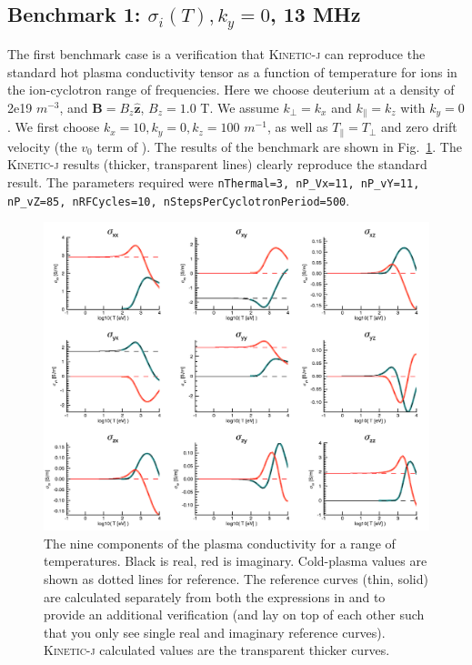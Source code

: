 \documentclass[final,5p,times,twocolumn]{elsarticle}
\let\oldhat\hat
\renewcommand{\vec}[1]{\mathbf{#1}}
\renewcommand{\hat}[1]{\oldhat{\mathbf{#1}}}
\newcommand{\kj}{\textsc{Kinetic-j}\xspace}
\begin{document}
\subsection{Benchmark 1: $\sigma_i\left(T\right), k_{y}=0$, 13 MHz}
\label{section:verification1}
%
The first benchmark case is a verification that \kj can reproduce the standard hot plasma conductivity tensor as a function of temperature for ions in the ion-cyclotron range of frequencies. Here we choose deuterium at a density of 2e19 $m^{-3}$, and $\vec{B}=B_z\hat{\vec{z}}$, $B_z=1.0$ T. We assume $k_\perp=k_x$ and $k_\parallel=k_z$ with $k_y=0$. We first choose $k_x=10,k_y=0,k_z=100$ $m^{-1}$, as well as $T_\parallel=T_\perp$ and zero drift velocity (the $v_0$ term of \cite{swanson}). The results of the benchmark are shown in Fig.~\ref{fig:b1}. The \kj results (thicker, transparent lines) clearly reproduce the standard result. The parameters required were \texttt{nThermal=3, nP\_Vx=11, nP\_vY=11, nP\_vZ=85, nRFCycles=10, nStepsPerCyclotronPeriod=500}.
%
\begin{figure}
\centering
\includegraphics[]{figures/benchmark1}
\caption{\label{fig:b1}The nine components of the plasma conductivity for a range of temperatures. Black is real, red is imaginary. Cold-plasma values are shown as dotted lines for reference. The reference curves (thin, solid) are calculated separately from both the expressions in \cite{brambilla} and \cite{swanson} to provide an additional verification (and lay on top of each other such that you only see single real and imaginary reference curves). \kj calculated values are the transparent thicker curves.}
\end{figure}
%
\end{document}
